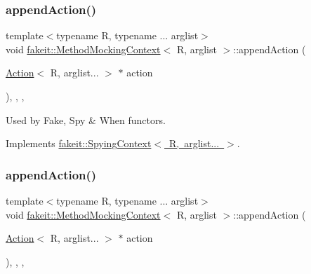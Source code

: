 \subsubsection{\texorpdfstring{appendAction()}{appendAction()}\hspace{0.1cm}{\footnotesize\ttfamily [1/9]}}
{\footnotesize\ttfamily template$<$typename R, typename ... arglist$>$ \\
void \mbox{\hyperlink{classfakeit_1_1MethodMockingContext}{fakeit\+::\+Method\+Mocking\+Context}}$<$ R, arglist $>$\+::append\+Action (\begin{DoxyParamCaption}\item[{\mbox{\hyperlink{structfakeit_1_1Action}{Action}}$<$ R, arglist... $>$ $\ast$}]{action }\end{DoxyParamCaption})\hspace{0.3cm}{\ttfamily [inline]}, {\ttfamily [override]}, {\ttfamily [protected]}, {\ttfamily [virtual]}}



Used by Fake, Spy \& When functors. 



Implements \mbox{\hyperlink{structfakeit_1_1SpyingContext_ae7eaf07b2bf6a451e5831bfa2769e9c6}{fakeit\+::\+Spying\+Context$<$ R, arglist... $>$}}.

\mbox{\label{classfakeit_1_1MethodMockingContext_ad413d04564c89fe134dfb7bae1a1f2a1}} 
\subsubsection{\texorpdfstring{appendAction()}{appendAction()}\hspace{0.1cm}{\footnotesize\ttfamily [2/9]}}
{\footnotesize\ttfamily template$<$typename R, typename ... arglist$>$ \\
void \mbox{\hyperlink{classfakeit_1_1MethodMockingContext}{fakeit\+::\+Method\+Mocking\+Context}}$<$ R, arglist $>$\+::append\+Action (\begin{DoxyParamCaption}\item[{\mbox{\hyperlink{structfakeit_1_1Action}{Action}}$<$ R, arglist... $>$ $\ast$}]{action }\end{DoxyParamCaption})\hspace{0.3cm}{\ttfamily [inline]}, {\ttfamily [override]}, {\ttfamily [protected]}, {\ttfamily [virtual]}}



